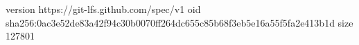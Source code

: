 version https://git-lfs.github.com/spec/v1
oid sha256:0ac3e52de83a42f94c30b0070ff264dc655c85b68f3eb5e16a55f5fa2e413b1d
size 127801

